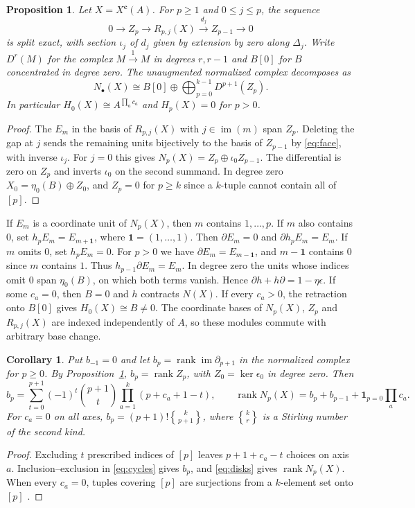 \documentclass[11pt]{article}
\newtheorem{proposition}[theorem]{Proposition}
\newtheorem{corollary}[theorem]{Corollary}
\theoremstyle{definition}
\theoremstyle{remark}
\DeclareMathOperator{\im}{im}
\DeclareMathOperator{\rank}{rank}
\newcommand{\SII}[2]{\genfrac{\{}{\}}{0pt}{}{#1}{#2}}
\begin{document}
\begin{proposition}\label{prop:disks}
Let $X=X^{\mathbf c}(A)$. For $p\geq1$ and $0\leq j\leq p$, the sequence
\[
 0\longrightarrow Z_p\longrightarrow R_{p,j}(X)
 \xrightarrow{d_j} Z_{p-1}\longrightarrow0
\]
is split exact, with section $\iota_j$ of $d_j$ given by extension by
zero along $\Delta_j$.
Write $D^r(M)$ for the complex $M\xrightarrow{1}M$ in degrees $r,r-1$
and $B[0]$ for $B$ concentrated in degree zero.
The unaugmented normalized complex decomposes as
\begin{equation}\label{eq:disks}
 N_\bullet(X)\cong B[0]\oplus\bigoplus_{p=0}^{k-1}D^{p+1}(Z_p).
\end{equation}
In particular $H_0(X)\cong A^{\prod_a c_a}$ and $H_p(X)=0$ for $p>0$.
\end{proposition}
\begin{proof}
The $E_m$ in the basis of $R_{p,j}(X)$ with $j\in\im(m)$ span $Z_p$.
Deleting the gap at $j$ sends the remaining units bijectively to the basis of
$Z_{p-1}$ by \eqref{eq:face}, with inverse $\iota_j$.
For $j=0$ this gives $N_p(X)=Z_p\oplus\iota_0 Z_{p-1}$.
The differential is zero on $Z_p$ and inverts $\iota_0$ on the second summand.
In degree zero $X_0=\eta_0(B)\oplus Z_0$, and $Z_p=0$ for $p\geq k$
since a $k$-tuple cannot contain all of $[p]$.
\end{proof}

If $E_m$ is a coordinate unit of $N_p(X)$, then $m$ contains $1,\ldots,p$.
If $m$ also contains $0$, set
$h_pE_m=E_{m+\mathbf1}$, where $\mathbf1=(1,\ldots,1)$. Then
$\partial E_m=0$ and $\partial h_pE_m=E_m$.
If $m$ omits $0$, set $h_pE_m=0$. For $p>0$ we have
$\partial E_m=E_{m-\mathbf1}$, and $m-\mathbf1$ contains $0$ since $m$
contains $1$. Thus $h_{p-1}\partial E_m=E_m$.
In degree zero the units whose indices omit $0$ span $\eta_0(B)$,
on which both terms vanish. Hence $\partial h+h\partial=1-\eta\epsilon$.
If some $c_a=0$, then $B=0$ and $h$ contracts $N(X)$.
If every $c_a>0$, the retraction onto $B[0]$ gives $H_0(X)\cong B\ne0$.
The coordinate bases of $N_p(X)$, $Z_p$ and
$R_{p,j}(X)$ are indexed independently of $A$, so these modules commute
with arbitrary base change.

\begin{corollary}\label{cor:ranks}
Put $b_{-1}=0$ and let $b_p=\rank\im\partial_{p+1}$ in the normalized complex
for $p\geq0$. By Proposition~\ref{prop:disks}, $b_p=\rank Z_p$, with
$Z_0=\ker\epsilon_0$ in degree zero. Then
\[
 b_p=\sum_{t=0}^{p+1}(-1)^t\binom{p+1}{t}
          \prod_{a=1}^k(p+c_a+1-t),\qquad
 \rank N_p(X)=b_p+b_{p-1}+\mathbf 1_{p=0}\prod_a c_a.
\]
For $c_a=0$ on all axes, $b_p=(p+1)!\SII{k}{p+1}$, where
$\SII{k}{r}$ is a Stirling number of the second kind.
\end{corollary}
\begin{proof}
Excluding $t$ prescribed indices of $[p]$ leaves $p+1+c_a-t$ choices on
axis $a$. Inclusion--exclusion in \eqref{eq:cycles} gives $b_p$, and
\eqref{eq:disks} gives $\rank N_p(X)$. When every $c_a=0$, tuples covering $[p]$
are surjections from a $k$-element set onto $[p]$
\cite[\S1.4]{StanleyEC1}.
\end{proof}
\end{document}
